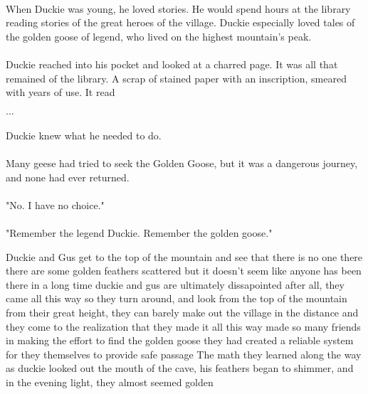 \documentclass[a4paper,10pt,standalone]{book}
\begin{document}
\paragraph{} When Duckie was young, he loved stories. He would spend hours at the library reading stories of the great heroes of the village. Duckie especially loved tales of the golden goose of legend, who lived on the highest mountain's peak. 
\paragraph{} Duckie reached into his pocket and looked at a charred page. It was all that remained of the library. A scrap of stained paper with an inscription, smeared with years of use. It read 
\paragraph{$\ldots$}
\paragraph{} Duckie knew what he needed to do.
\paragraph{} Many geese had tried to seek the Golden Goose, but it was a dangerous journey, and none had ever returned. 
\paragraph{} "No. I have no choice." 
\paragraph{} "Remember the legend Duckie. Remember the golden goose." 
\vfill
\pagebreak









Duckie and Gus get to the top of the mountain
and see that there is no one there
there are some golden feathers scattered
but it doesn't seem like anyone has been there in a long time
duckie and gus are ultimately dissapointed
after all, they came all this way
so they turn around, and look from the top of the mountain
from their great height, they can barely make out the village in the distance
and they come to the realization that
they made it all this way
made so many friends
in making the effort to find the golden goose
they had created a reliable system for they themselves to provide safe passage
The math they learned along the way
as duckie looked out the mouth of the cave, his feathers began to shimmer, and in the evening light, they almost seemed golden
\end{document}
